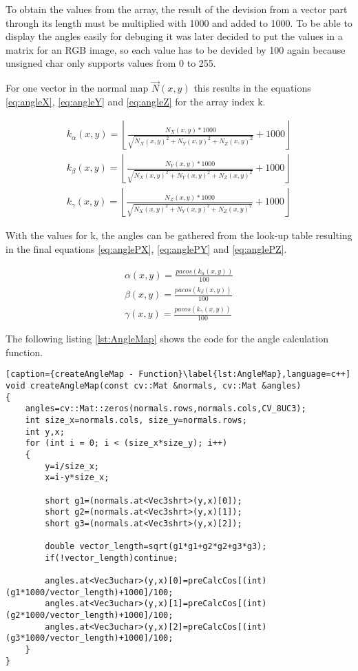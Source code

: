 To obtain the values from the array, the result of the devision from a vector part through its length
must be multiplied with 1000 and added to 1000. To be able to display the angles easily for debuging 
it was later decided to put the values in a matrix for an RGB image, so each value has to be devided 
by 100 again because unsigned char only supports values from 0 to 255.

For one vector in the normal map $\vec{N}(x,y)$ this results in the equations \ref{eq:angleX}, \ref{eq:angleY} and
\vref{eq:angleZ} for the array index k.

\begin{align}
	k_\alpha(x,y) = \left\lfloor\frac{N_X(x,y)*1000}{\sqrt{N_X(x,y)^2+N_Y(x,y)^2+N_Z(x,y)^2}}+1000 \right\rfloor
	\label{eq:angleX}\\
	k_\beta(x,y) = \left\lfloor\frac{N_Y(x,y)*1000}{\sqrt{N_X(x,y)^2+N_Y(x,y)^2+N_Z(x,y)^2}}+1000 \right\rfloor
	\label{eq:angleY}\\
	k_\gamma(x,y) = \left\lfloor\frac{N_Z(x,y)*1000}{\sqrt{N_X(x,y)^2+N_Y(x,y)^2+N_Z(x,y)^2}}+1000 \right\rfloor
	\label{eq:angleZ}
\end{align} 

With the values for k, the angles can be gathered from the look-up table resulting in the final equations \ref{eq:anglePX},
\ref{eq:anglePY} and \vref{eq:anglePZ}.

\begin{align}
	\alpha(x,y)=\frac{pacos({k_\alpha(x,y)})}{100}\label{eq:anglePX}\\
	\beta(x,y)=\frac{pacos({k_\beta(x,y)})}{100}\label{eq:anglePY}\\
	\gamma(x,y)=\frac{pacos({k_\gamma(x,y)})}{100}\label{eq:anglePZ}	
\end{align}



The following listing \vref{lst:AngleMap} shows the code for the angle calculation function.

\begin{lstlisting}[caption={createAngleMap - Function}\label{lst:AngleMap},language=c++]
void createAngleMap(const cv::Mat &normals, cv::Mat &angles)
{
	angles=cv::Mat::zeros(normals.rows,normals.cols,CV_8UC3);
	int size_x=normals.cols, size_y=normals.rows;
	int y,x;
	for (int i = 0; i < (size_x*size_y); i++)
	{ 
		y=i/size_x;
		x=i-y*size_x;

		short g1=(normals.at<Vec3shrt>(y,x)[0]);
		short g2=(normals.at<Vec3shrt>(y,x)[1]);
		short g3=(normals.at<Vec3shrt>(y,x)[2]);

		double vector_length=sqrt(g1*g1+g2*g2+g3*g3);
		if(!vector_length)continue;

		angles.at<Vec3uchar>(y,x)[0]=preCalcCos[(int)(g1*1000/vector_length)+1000]/100;
		angles.at<Vec3uchar>(y,x)[1]=preCalcCos[(int)(g2*1000/vector_length)+1000]/100;
		angles.at<Vec3uchar>(y,x)[2]=preCalcCos[(int)(g3*1000/vector_length)+1000]/100;
	}
}	
\end{lstlisting}

